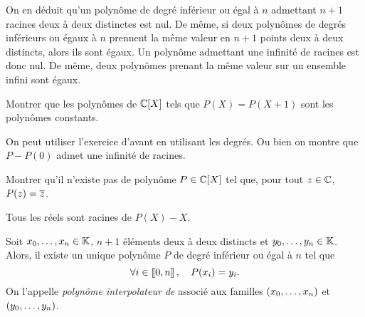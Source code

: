 \documentclass{magnolia}
\begin{document}
\begin{remarques}
\remarque On en déduit qu'un polynôme de degré inférieur ou égal à $n$
  admettant $n+1$ racines deux à deux distinctes est nul. De même, si deux
  polynômes de degrés inférieurs ou égaux à $n$ prennent la même valeur
  en $n+1$ points deux à deux distincts, alors ils sont égaux.
\remarque Un polynôme admettant une infinité de racines est donc nul. De même,
  deux polynômes prenant la même valeur sur un ensemble infini sont
  égaux.
\end{remarques}

\begin{exos}
\exo Montrer que les polynômes de $\polyC$ tels que $P(X)=P(X+1)$ sont les
  polynômes constants.
  \begin{sol}
  On peut utiliser l'exercice d'avant en utilisant les degrés. Ou bien on montre que $P-P(0)$ admet une  infinité de racines.
  \end{sol}
\exo Montrer qu'il n'existe pas de polynôme $P\in\polyC$ tel que, pour tout
  $z\in\mathbb{C}$, $P(z)=\overline{z}$.
  \begin{sol}
  Tous les réels sont racines de $P(X)-X$.
  \end{sol}
\end{exos}

\begin{proposition}[nom={Polynôme interpolateur de \nom{Lagrange}}]
Soit $x_0,\ldots,x_n\in\mathbb{K}$, $n+1$ éléments deux à deux distincts et $y_0,\ldots,y_n\in\mathbb{K}$. Alors,
il existe un unique polynôme $P$ de degré inférieur ou égal à $n$ tel que
\[\forall i\in\left\llbracket 0,n\right\rrbracket ,\quad P(x_i)=y_i.\]
On l'appelle \emph{polynôme interpolateur de } associé aux familles $\left(x_0,\ldots,x_{n}\right)$ et $\left(y_0,\ldots,y_{n}\right)$.
\end{proposition}
\end{document}
